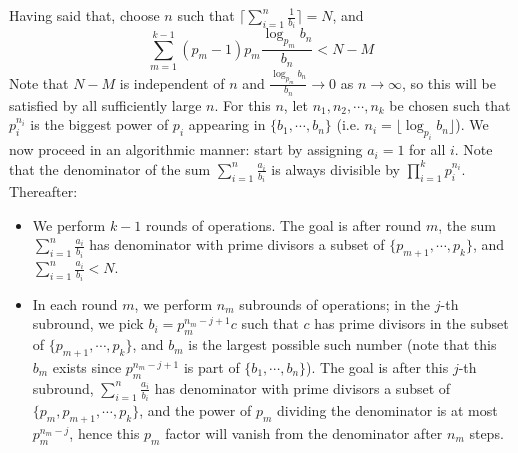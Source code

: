 \documentclass[11pt,a4paper]{article}
\begin{document}
\begin{enumerate}
    	Having said that, choose $n$ such that 
    	$\lceil\sum_{i=1}^n \frac{1}{b_i}\rceil = N$, 
    	and 
    	\[
    	\sum_{m=1}^{k-1} (p_m-1)p_m\frac{\log_{p_m} b_n}{b_n} < N - M
    	\]
    	Note that $N-M$ is independent of $n$ and $\frac{\log_{p_m} b_n}{b_n}\to 0$ as $n\to\infty$, 
    	so this will be satisfied by all sufficiently large $n$. 
    	For this $n$, let $n_1, n_2, \cdots, n_k$ be chosen such that $p_i^{n_i}$ is the biggest power of $p_i$ appearing in $\{b_1, \cdots, b_n\}$ 
    	(i.e. $n_i = \lfloor \log_{p_i} b_n\rfloor$).
    	We now proceed in an algorithmic manner: 
    	start by assigning $a_i=1$ for all $i$. 
    	Note that the denominator of the sum 
    	$\sum_{i=1}^n \frac{a_i}{b_i}$ is always divisible by $\prod_{i=1}^k p_i^{n_i}$. 
    	Thereafter: 
    	\begin{itemize}
    		\item We perform $k - 1$ rounds of operations. 
    		The goal is after round $m$, the sum 
    		$\sum_{i=1}^n \frac{a_i}{b_i}$ has denominator with prime divisors a subset of 
    		$\{p_{m+1}, \cdots, p_k\}$, and 
    		$\sum_{i=1}^n \frac{a_i}{b_i} < N$. 
    		
    		\item In each round $m$, we perform 
    		$n_m$ subrounds of operations; 
    		in the $j$-th subround, we pick 
    		$b_i = p_m^{n_m-j+1}c$ such that $c$ has prime divisors in the subset of $\{p_{m+1}, \cdots, p_k\}$, 
    		and $b_m$ is the largest possible such number 
    		(note that this $b_m$ exists since $p_m^{n_m-j+1}$ is part of $\{b_1, \cdots, b_n\}$). 
    		The goal is after this $j$-th subround, 
    		$\sum_{i=1}^n \frac{a_i}{b_i}$ has denominator with prime divisors a subset of 
    		$\{p_m, p_{m+1}, \cdots, p_k\}$, 
    		and the power of $p_m$ dividing the denominator is at most $p_m^{n_m-j}$, 
    		hence this $p_m$ factor will vanish from the denominator after $n_m$ steps. 
    		

\end{itemize}
\end{enumerate}
\end{document}
